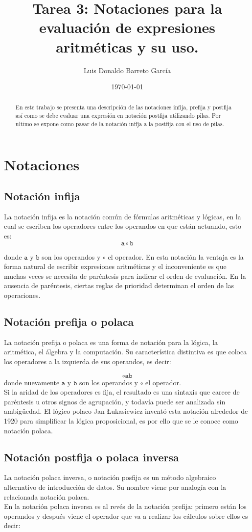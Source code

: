 \documentclass[12pt ]{article}
\author{Luis Donaldo Barreto Garc\'ia}
\date{\today}
\title{Tarea 3: Notaciones para la evaluación de expresiones aritméticas y su uso.}
\begin{document}
	\maketitle
\begin{abstract}
	En este trabajo se presenta una descripción de las notaciones infija, prefija y postfija así como se debe evaluar una expresión en notación postfija utilizando pilas. Por ultimo se expone como pasar de la notación infija a la postfija con el uso de pilas.
\end{abstract}


\section{Notaciones}
\subsection{Notación infija}
La notación  infija es la notación común de fórmulas aritméticas y lógicas, en la cual se escriben los operadores entre los operandos en que están actuando, esto es:
	$$ \mathtt{a} \circ \mathtt{b}$$

donde $\mathtt{a}$ y $\mathtt{b}$ son los operandos y $\circ$ el operador.
En esta notación la ventaja es la forma natural de escribir expresiones aritméticas y el inconveniente es que muchas veces se necesita de paréntesis para indicar el orden de evaluación. En la ausencia de paréntesis, ciertas reglas de prioridad determinan el orden de las operaciones.
\subsection{Notación prefija o polaca}

La notación prefija o polaca es una forma de notación para la lógica, la aritmética, el álgebra y la computación. Su característica distintiva es que coloca los operadores a la izquierda de sus operandos, es decir:

$$ \circ \mathtt{a} \mathtt{b}$$
donde nuevamente $\mathtt{a}$ y $\mathtt{b}$ son los operandos y $\circ$ el operador.\\
Si la aridad de los operadores es fija, el resultado es una sintaxis que carece de paréntesis u otros signos de agrupación, y todavía puede ser analizada sin ambigüedad. El lógico polaco Jan Łukasiewicz inventó esta notación alrededor de 1920 para simplificar la lógica proposicional, es por ello que se le conoce como notación polaca.
\subsection{Notación postfija o polaca inversa}
La notación polaca inversa,  o notación posfija es un método algebraico alternativo de introducción de datos. Su nombre viene por analogía con la relacionada notación polaca.\\En la notación polaca inversa es al revés de la notación prefija: primero están los operandos y después viene el operador que va a realizar los cálculos sobre ellos
es decir:
\end{document}

